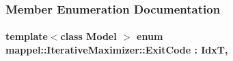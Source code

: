 \subsubsection{Member Enumeration Documentation}
\paragraph[{\texorpdfstring{Exit\+Code}{ExitCode}}]{\setlength{\rightskip}{0pt plus 5cm}template$<$class Model $>$ enum {\bf mappel\+::\+Iterative\+Maximizer\+::\+Exit\+Code} \+: {\bf IdxT}\hspace{0.3cm}{\ttfamily [strong]}, {\ttfamily [inherited]}}\hypertarget{classmappel_1_1IterativeMaximizer_a5dc8660cf33abf3f3a576f051466521c}{}\label{classmappel_1_1IterativeMaximizer_a5dc8660cf33abf3f3a576f051466521c}
